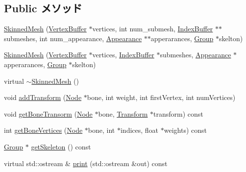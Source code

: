 \subsection*{Public メソッド}
\begin{CompactItemize}
\item 
\hyperlink{classm3g_1_1SkinnedMesh_9ee04e655db4e2a95a0ab55d8ebb45c8}{SkinnedMesh} (\hyperlink{classm3g_1_1VertexBuffer}{VertexBuffer} $\ast$vertices, int num\_\-submesh, \hyperlink{classm3g_1_1IndexBuffer}{IndexBuffer} $\ast$$\ast$submeshes, int num\_\-appearance, \hyperlink{classm3g_1_1Appearance}{Appearance} $\ast$$\ast$apperarances, \hyperlink{classm3g_1_1Group}{Group} $\ast$skelton)
\item 
\hyperlink{classm3g_1_1SkinnedMesh_145692b6dfd3581aae05ef8f5db20a99}{SkinnedMesh} (\hyperlink{classm3g_1_1VertexBuffer}{VertexBuffer} $\ast$vertices, \hyperlink{classm3g_1_1IndexBuffer}{IndexBuffer} $\ast$submeshes, \hyperlink{classm3g_1_1Appearance}{Appearance} $\ast$apperarances, \hyperlink{classm3g_1_1Group}{Group} $\ast$skelton)
\item 
virtual \hyperlink{classm3g_1_1SkinnedMesh_c73da5b5c5f8f14fc241328b4b78928c}{$\sim$SkinnedMesh} ()
\item 
void \hyperlink{classm3g_1_1SkinnedMesh_4b6fd5f52884251fdda11ad4a40d41d4}{addTransform} (\hyperlink{classm3g_1_1Node}{Node} $\ast$bone, int weight, int firstVertex, int numVertices)
\item 
void \hyperlink{classm3g_1_1SkinnedMesh_b0023a2cdce8d562a4988024e8644a13}{getBoneTransorm} (\hyperlink{classm3g_1_1Node}{Node} $\ast$bone, \hyperlink{classm3g_1_1Transform}{Transform} $\ast$transform) const 
\item 
int \hyperlink{classm3g_1_1SkinnedMesh_e14038d004d58e797f10fbfa6a9a18d9}{getBoneVertices} (\hyperlink{classm3g_1_1Node}{Node} $\ast$bone, int $\ast$indices, float $\ast$weights) const 
\item 
\hyperlink{classm3g_1_1Group}{Group} $\ast$ \hyperlink{classm3g_1_1SkinnedMesh_ce7d69c2b600f6f01a46214db28e6f92}{getSkeleton} () const 
\item 
virtual std::ostream \& \hyperlink{classm3g_1_1SkinnedMesh_6fea17fa1532df3794f8cb39cb4f911f}{print} (std::ostream \&out) const 
\end{CompactItemize}
